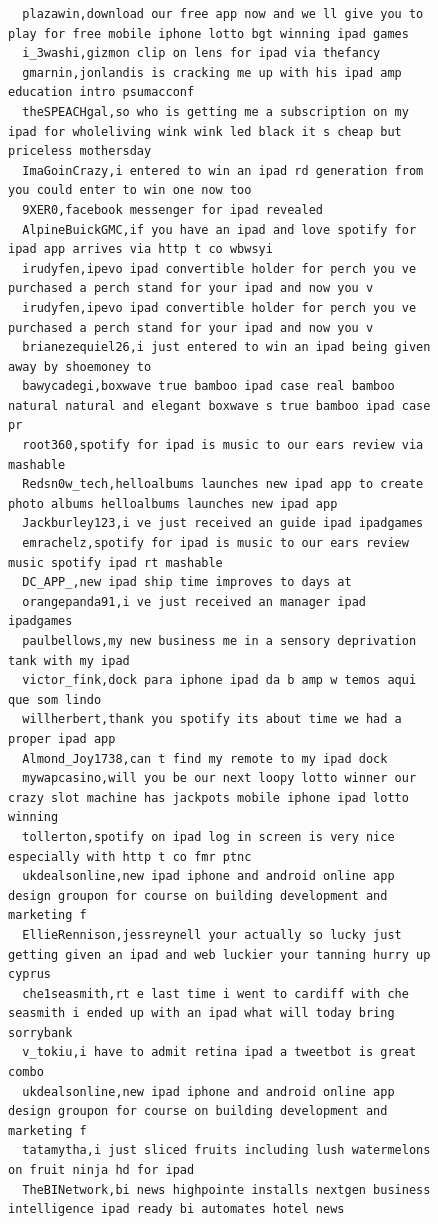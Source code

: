\begin{figure}[htpb]
\begin{verbatim}
  plazawin,download our free app now and we ll give you to play for free mobile iphone lotto bgt winning ipad games
  i_3washi,gizmon clip on lens for ipad via thefancy
  gmarnin,jonlandis is cracking me up with his ipad amp education intro psumacconf
  theSPEACHgal,so who is getting me a subscription on my ipad for wholeliving wink wink led black it s cheap but priceless mothersday
  ImaGoinCrazy,i entered to win an ipad rd generation from you could enter to win one now too
  9XER0,facebook messenger for ipad revealed
  AlpineBuickGMC,if you have an ipad and love spotify for ipad app arrives via http t co wbwsyi
  irudyfen,ipevo ipad convertible holder for perch you ve purchased a perch stand for your ipad and now you v
  irudyfen,ipevo ipad convertible holder for perch you ve purchased a perch stand for your ipad and now you v
  brianezequiel26,i just entered to win an ipad being given away by shoemoney to
  bawycadegi,boxwave true bamboo ipad case real bamboo natural natural and elegant boxwave s true bamboo ipad case pr
  root360,spotify for ipad is music to our ears review via mashable
  Redsn0w_tech,helloalbums launches new ipad app to create photo albums helloalbums launches new ipad app
  Jackburley123,i ve just received an guide ipad ipadgames
  emrachelz,spotify for ipad is music to our ears review music spotify ipad rt mashable
  DC_APP_,new ipad ship time improves to days at
  orangepanda91,i ve just received an manager ipad ipadgames
  paulbellows,my new business me in a sensory deprivation tank with my ipad
  victor_fink,dock para iphone ipad da b amp w temos aqui que som lindo
  willherbert,thank you spotify its about time we had a proper ipad app
  Almond_Joy1738,can t find my remote to my ipad dock
  mywapcasino,will you be our next loopy lotto winner our crazy slot machine has jackpots mobile iphone ipad lotto winning
  tollerton,spotify on ipad log in screen is very nice especially with http t co fmr ptnc
  ukdealsonline,new ipad iphone and android online app design groupon for course on building development and marketing f
  EllieRennison,jessreynell your actually so lucky just getting given an ipad and web luckier your tanning hurry up cyprus
  che1seasmith,rt e last time i went to cardiff with che seasmith i ended up with an ipad what will today bring sorrybank
  v_tokiu,i have to admit retina ipad a tweetbot is great combo
  ukdealsonline,new ipad iphone and android online app design groupon for course on building development and marketing f
  tatamytha,i just sliced fruits including lush watermelons on fruit ninja hd for ipad
  TheBINetwork,bi news highpointe installs nextgen business intelligence ipad ready bi automates hotel news

\end{verbatim}
\end{figure}

